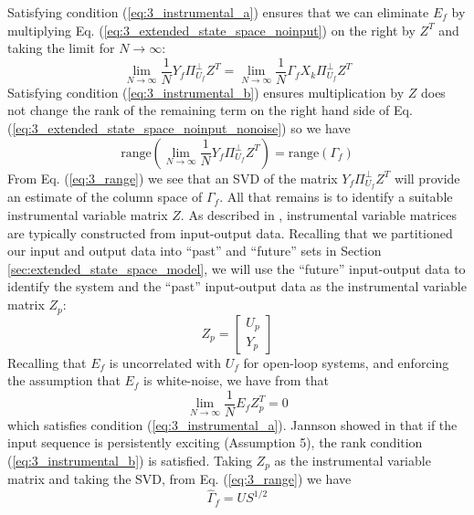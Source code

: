 Satisfying condition (\ref{eq:3_instrumental_a}) ensures that we can eliminate $E_f$ by multiplying Eq. (\ref{eq:3_extended_state_space_noinput}) on the right by $Z^T$ and taking the limit for $N\rightarrow\infty$:
\begin{equation}\label{eq:3_extended_state_space_noinput_nonoise}
\lim_{N\rightarrow\infty} \frac{1}{N}Y_f\Pi_{U_f}^\perp Z^T = \lim_{N\rightarrow\infty} \frac{1}{N}\Gamma_f X_k\Pi_{U_f}^\perp Z^T
\end{equation}
 Satisfying condition (\ref{eq:3_instrumental_b}) ensures multiplication by $Z$ does not change the rank of the remaining term on the right hand side of Eq. (\ref{eq:3_extended_state_space_noinput_nonoise}) so we have
\begin{equation}\label{eq:3_range}
\mbox{range}\left(\lim_{N\rightarrow\infty} \frac{1}{N} Y_f\Pi_{U_f}^\perp Z^T\right) = \mbox{range}\left(\Gamma_f\right)
\end{equation}
From Eq. (\ref{eq:3_range}) we see that an SVD of the matrix $Y_f\Pi_{U_f}^\perp Z^T$  will provide an estimate of the column space of $\Gamma_f$. All that remains is to identify a suitable instrumental variable matrix $Z$. As described in \cite{soderstrom1983instrumental, verhaegen2007filtering}, instrumental variable matrices are typically constructed from input-output data. Recalling that we partitioned our input and output data into ``past'' and ``future'' sets in Section \ref{sec:extended_state_space_model}, we will use the ``future'' input-output data to identify the system and the ``past'' input-output data as the instrumental variable matrix $Z_p$:
\begin{equation*}
Z_p = \begin{bmatrix}U_p\\ Y_p\end{bmatrix}
\end{equation*}
Recalling that $E_f$ is uncorrelated with $U_f$ for open-loop systems, and enforcing the assumption that $E_f$ is white-noise, we have from \cite{verhaegen2007filtering} that 
\begin{equation*}
\lim_{N\rightarrow\infty} \frac{1}{N} E_f Z_p^T = 0
\end{equation*}
which satisfies condition (\ref{eq:3_instrumental_a}). Jannson showed in \cite{jansson1997subspace} that if the input sequence is persistently exciting (Assumption 5), the rank condition (\ref{eq:3_instrumental_b}) is satisfied. Taking $Z_p$ as the instrumental variable matrix and taking the SVD, from Eq. (\ref{eq:3_range}) we have
\begin{equation}
\hat{\Gamma}_f = U {S}^{1/2}
\end{equation}


